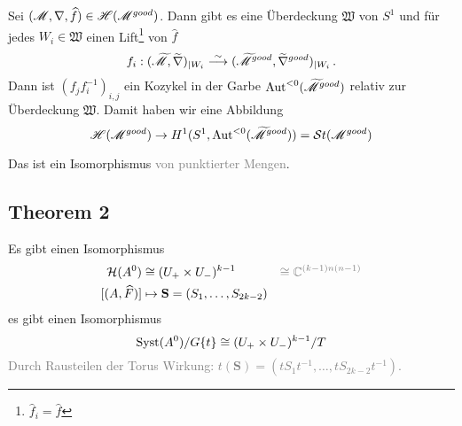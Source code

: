 Sei $(\mathscr{M},\nabla,\widehat f)\in\mathscr{H}(\mathscr{M}^{good})$. Dann gibt es eine Überdeckung
$\mathfrak{W}$ von $S^1$ und für jedes $W_i\in\mathfrak{W}$ einen
Lift\footnote{$\hat f_i=\hat f$} von $\hat f$
\[
  f_i:(\widetilde{\mathscr{M}},\widetilde\nabla)_{|W_i}
  \overset{\sim}{\longrightarrow}
  (\widetilde{\mathscr{M}}^{good},\widetilde\nabla^{good})_{|W_i} \,.
\]
Dann ist $(f_jf_i^{-1})_{i,j}$ ein Kozykel in der Garbe
$\operatorname{Aut}^{<0}(\widetilde{\mathscr{M}}^{good})$ relativ zur Überdeckung $\mathfrak{W}$.
Damit haben wir eine Abbildung
\[
  \mathscr{H}(\mathscr{M}^{good})\to H^1(S^1,\operatorname{Aut}^{<0}(\widetilde{\mathscr{M}}^{good}))=\mathcal{S}{}t(\mathscr{M}^{good})
\]
\begin{tthm}
  Das ist ein Isomorphismus \textcolor{gray}{von punktierter Mengen}.
\end{tthm}
\subsection{Theorem 2} %
\begin{tthm}
  Es gibt einen Isomorphismus
  \begin{align*}
    \cH(A^0)&\cong(U_+\times U_-)^{k-1}
    &\textcolor{gray}{\cong\C^{(k-1)n(n-1)}}
  \\ [(A,\hat F)]&\mapsto\textbf{S}=(S_1,\dots,S_{2k-2})
  \end{align*}
  es gibt einen Isomorphismus
  \[
    \operatorname{Syst}(A^0)/G\{t\}\cong(U_+\times U_-)^{k-1}/T
  \]
  \textcolor{gray}{Durch Rausteilen der Torus 
    Wirkung: $t(\textbf{S})=(tS_1t^{-1},\dots,tS_{2k-2}t^{-1})$.}
\end{tthm}

